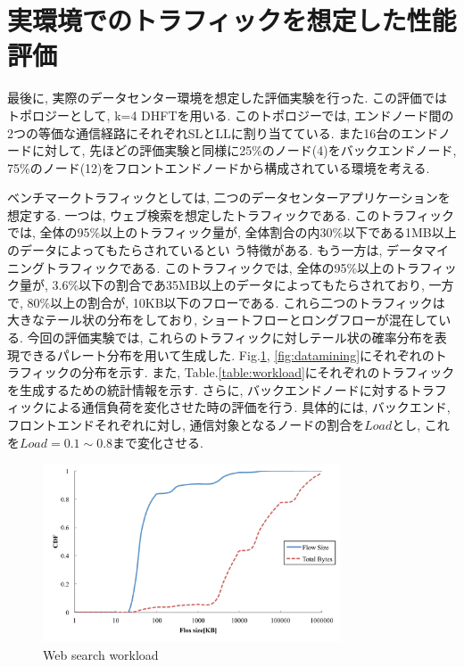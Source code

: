 \section{実環境でのトラフィックを想定した性能評価}
最後に, 実際のデータセンター環境を想定した評価実験を行った. 
この評価ではトポロジーとして, k=4 DHFTを用いる. 
このトポロジーでは, エンドノード間の2つの等価な通信経路にそれぞれSLとLLに割り当てている.
また16台のエンドノードに対して, 先ほどの評価実験と同様に25\%のノード(4)をバックエンドノード,
75\%のノード(12)をフロントエンドノードから構成されている環境を考える. 

ベンチマークトラフィックとしては, 二つのデータセンターアプリケーションを想定する. 
一つは, ウェブ検索を想定したトラフィック\cite{dctcp}である. 
このトラフィックでは, 全体の95\%以上のトラフィック量が, 全体割合の内30\%以下である1MB以上のデータによってもたらされているとい
う特徴がある. 
もう一方は, データマイニングトラフィックである\cite{vl2}. 
このトラフィックでは, 全体の95\%以上のトラフィック量が, 3.6\%以下の割合であ35MB以上のデータによってもたらされており, 一方で,
80\%以上の割合が, 10KB以下のフローである. 
これら二つのトラフィックは大きなテール状の分布をしており, ショートフローとロングフローが混在している. 
今回の評価実験では, これらのトラフィックに対しテール状の確率分布を表現できるパレート分布を用いて生成した.  
Fig.\ref{fig:websearch}, \ref{fig:datamining}にそれぞれのトラフィックの分布を示す. 
また, Table.\ref{table:workload}にそれぞれのトラフィックを生成するための統計情報を示す. 
さらに, バックエンドノードに対するトラフィックによる通信負荷を変化させた時の評価を行う. 
具体的には, バックエンド, フロントエンドそれぞれに対し, 通信対象となるノードの割合を$Load$とし, これを$Load=0.1 \sim
0.8$まで変化させる. 

\begin{figure}[t]
    \begin{center}
    \includegraphics[autoebb, width=250pt]{./img/websearch.pdf}
    \caption{Web search workload}
    \label{fig:websearch}
    \end{center}
\end{figure}

